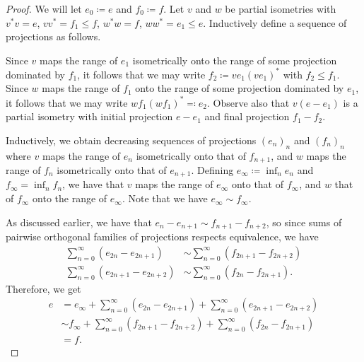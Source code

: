 \documentclass[10pt]{mypackage}
\renewcommand{\coloneq}{\coloneqq}
\begin{document}
\begin{proof}
  We will let $e_0 \coloneq e$ and $f_0 \coloneq f$. Let $v$ and $w$ be partial isometries with $v^{\ast}v = e$, $vv^{\ast} = f_1\leq f$, $w^{\ast}w = f$, $ww^{\ast} = e_1\leq e$. Inductively define a sequence of projections as follows.

  Since $v$ maps the range of $e_1$ isometrically onto the range of some projection dominated by $f_1$, it follows that we may write $f_2\coloneq ve_1 \left( ve_1 \right)^{\ast}$ with $f_2\leq f_1$. Since $w$ maps the range of $f_1$ onto the range of some projection dominated by $e_1$, it follows that we may write $wf_1 \left( wf_1 \right)^{\ast}\eqcolon e_2$. Observe also that $v\left( e-e_1 \right)$ is a partial isometry with initial projection $e-e_1$ and final projection $f_1-f_2$.

  Inductively, we obtain decreasing sequences of projections $\left( e_n \right)_n$ and $\left( f_n \right)_n$ where $v$ maps the range of $e_n$ isometrically onto that of $f_{n+1}$, and $w$ maps the range of $f_n$ isometrically onto that of $e_{n+1}$. Defining $e_{\infty}\coloneq \inf_{n} e_n$ and $f_{\infty} = \inf_n f_n$, we have that $v$ maps the range of $e_{\infty}$ onto that of $f_{\infty}$, and $w$ that of $f_{\infty}$ onto the range of $e_{\infty}$. Note that we have $e_{\infty}\sim f_{\infty}$.

  As discussed earlier, we have that $e_n-e_{n+1}\sim f_{n+1}-f_{n+2}$, so since sums of pairwise orthogonal families of projections respects equivalence, we have
  \begin{align*}
    \sum_{n=0}^{\infty} \left( e_{2n}-e_{2n+1} \right) &\sim \sum_{n=0}^{\infty}\left( f_{2n+1}-f_{2n+2} \right)\\
    \sum_{n=0}^{\infty} \left( e_{2n+1}-e_{2n+2} \right) &\sim \sum_{n=0}^{\infty}\left( f_{2n}-f_{2n+1} \right).
  \end{align*}
  Therefore, we get
  \begin{align*}
    e &= e_{\infty} + \sum_{n=0}^{\infty} \left( e_{2n}-e_{2n+1} \right) + \sum_{n=0}^{\infty} \left( e_{2n+1}-e_{2n+2} \right)\\
      &\sim f_{\infty} + \sum_{n=0}^{\infty} \left( f_{2n+1}-f_{2n+2} \right) + \sum_{n=0}^{\infty} \left( f_{2n}-f_{2n+1} \right)\\
      &= f.
  \end{align*}
\end{proof}
\end{document}
